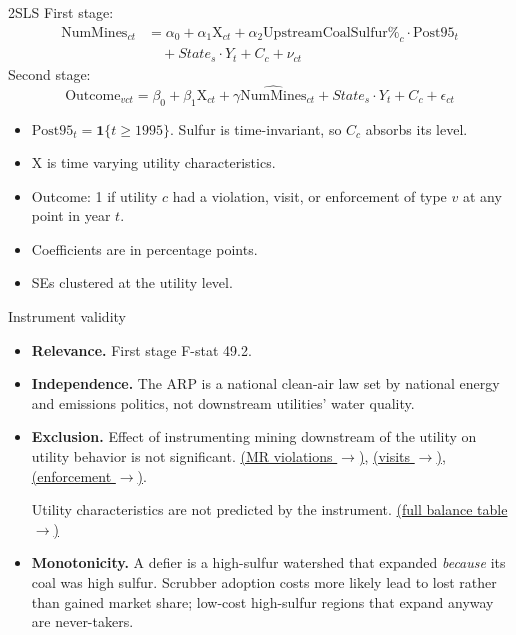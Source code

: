 \documentclass{beamer}
\newcommand{\backuplink}[2]{\hyperlink{#1}{\footnotesize(#2 $\rightarrow$)}}
\begin{document}
\begin{frame}{2SLS}
First stage:
\begin{equation*}
\begin{split}
\text{NumMines}_{ct} &= \alpha_0 + \alpha_1\text{X}_{ct} + \alpha_2\text{UpstreamCoalSulfur\%}_c \cdot \text{Post95}_t \\
&\quad + State_s \cdot Y_t + C_c + \nu_{ct}
\end{split}
\end{equation*}
Second stage:
\begin{equation*}
\text{Outcome}_{vct} = \beta_0 + \beta_1\text{X}_{ct} + \gamma\widehat{\text{NumMines}}_{ct} + State_s \cdot Y_t + C_c + \epsilon_{ct}
\end{equation*}
\begin{itemize}\small
    \item $\text{Post95}_t = \mathbf{1}\{t \geq 1995\}$. Sulfur is time-invariant, so $C_c$ absorbs its level.
    \item X is time varying utility characteristics.
    \item Outcome: 1 if utility $c$ had a violation, visit, or enforcement of type $v$ at any point in year $t$. 
    \item Coefficients are in percentage points.
    \item SEs clustered at the utility level.
\end{itemize}
\end{frame}

\begin{frame}{Instrument validity}
\begin{itemize}\small
    \item \textbf{Relevance.} First stage F-stat 49.2.
    \item \textbf{Independence.} The ARP is a national clean-air law set by national energy and emissions politics, not downstream utilities' water quality.
    \item \textbf{Exclusion.} Effect of instrumenting mining downstream of the utility on utility behavior is not significant. \backuplink{kgridmrup}{MR violations}, \backuplink{kgridvisitup}{visits}, \backuplink{kgridenfup}{enforcement}.

    Utility characteristics are not predicted by the instrument. \backuplink{exclfacilities}{full balance table}
    \item \textbf{Monotonicity.} A defier is a high-sulfur watershed that expanded \emph{because} its coal was high sulfur. Scrubber adoption costs more likely lead to lost rather than gained market share; low-cost high-sulfur regions that expand anyway are never-takers. 
\end{itemize}
\end{frame}
\end{document}
